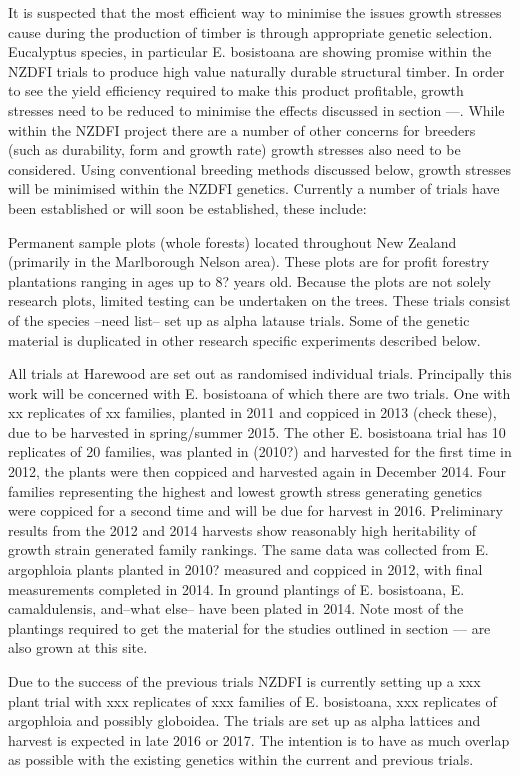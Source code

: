 \documentclass{article}
\begin{document}
It is suspected that the most efficient way to minimise the issues growth
stresses cause during the production of timber is through appropriate genetic
selection. Eucalyptus species, in particular E. bosistoana are showing promise
within the NZDFI trials to produce high value naturally durable structural
timber. In order to see the yield efficiency required to make this product
profitable, growth stresses need to be reduced to minimise the effects discussed
in section ---. While within the NZDFI project there are a number of other
concerns for breeders (such as durability, form and growth rate) growth stresses
also need to be considered. Using conventional breeding methods discussed below,
growth stresses will be minimised within the NZDFI genetics. Currently a number
of trials have been established or will soon be established, these include:

Permanent sample plots (whole forests) located throughout New Zealand (primarily
in the Marlborough Nelson area). These plots are for profit forestry plantations
ranging in ages up to 8? years old. Because the plots are not solely research
plots, limited testing can  be undertaken on the trees. These trials consist of
the species --need list-- set up as alpha latause trials. Some of the genetic
material is duplicated in other research specific experiments described below.

All trials at Harewood are set out as randomised individual trials. Principally
this work will be concerned with E. bosistoana of which there  are two trials.
One with xx replicates of xx families, planted in 2011 and coppiced in 2013
(check these), due to be harvested in spring/summer 2015. The other E.
bosistoana trial has 10 replicates of 20 families, was planted in (2010?) and
harvested for the first time in 2012, the plants were then coppiced and
harvested again in December 2014. Four families representing the highest and
lowest growth stress generating genetics were coppiced for a second time and
will be due for harvest in 2016. Preliminary results from the 2012 and 2014
harvests show reasonably high heritability of growth strain generated family
rankings. The same data was collected from E. argophloia plants planted in 2010?
measured and coppiced in 2012, with final measurements completed in 2014.  In
ground plantings of E. bosistoana, E. camaldulensis, and--what else-- have been
plated in 2014. Note most of the plantings required to get the material for the
studies outlined in section --- are also grown at this site.

Due to the success of the previous trials NZDFI is currently setting up a xxx
plant trial with xxx replicates of xxx families of E. bosistoana, xxx replicates
of argophloia and possibly globoidea. The trials are set up as alpha lattices
and harvest is expected in late 2016 or 2017. The intention is to have as much
overlap as possible with the existing genetics within the current and previous
trials.
\end{document}
